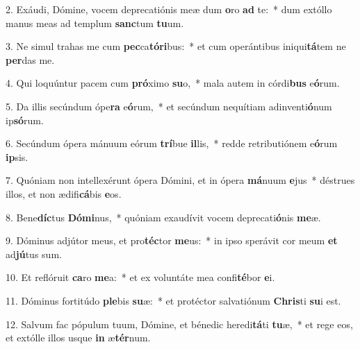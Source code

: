 2. Exáudi, Dómine, vocem deprecatiónis meæ dum \textbf{o}ro \textbf{ad} te:~*  dum extóllo manus meas ad templum \textbf{sanc}tum \textbf{tu}um.\

3. Ne simul trahas me cum \textbf{pec}ca\textbf{tó}\textbf{ri}bus:~*  et cum operántibus iniqui\textbf{tá}tem ne \textbf{per}das me.\

4. Qui loquúntur pacem cum \textbf{pró}ximo \textbf{su}o,~*  mala autem in córdi\textbf{bus} e\textbf{ó}rum.\

5. Da illis secúndum ópe\textbf{ra} e\textbf{ó}rum,~*  et secúndum nequítiam adinventi\textbf{ó}num ip\textbf{só}rum.\

6. Secúndum ópera mánuum eórum \textbf{trí}bue \textbf{il}lis,~*  redde retributiónem e\textbf{ó}rum \textbf{ip}sis.\

7. Quóniam non intellexérunt ópera Dómini, et in ópera \textbf{má}nuum \textbf{e}jus~*  déstrues illos, et non ædifi\textbf{cá}bis \textbf{e}os.\

8. Bene\textbf{díc}tus \textbf{Dó}\textbf{mi}nus,~*  quóniam exaudívit vocem deprecati\textbf{ó}nis \textbf{me}æ.\

9. Dóminus adjútor meus, et pro\textbf{téc}tor \textbf{me}us:~*  in ipso sperávit cor meum \textbf{et} ad\textbf{jú}tus sum.\

10. Et reflóruit \textbf{ca}ro \textbf{me}a:~*  et ex voluntáte mea confi\textbf{té}bor \textbf{e}i.\

11. Dóminus fortitúdo \textbf{ple}bis \textbf{su}æ:~*  et protéctor salvatiónum \textbf{Chris}ti \textbf{su}i est.\

12. Salvum fac pópulum tuum, Dómine, et bénedic heredi\textbf{tá}ti \textbf{tu}æ,~*  et rege eos, et extólle illos usque \textbf{in} æ\textbf{tér}num.\

